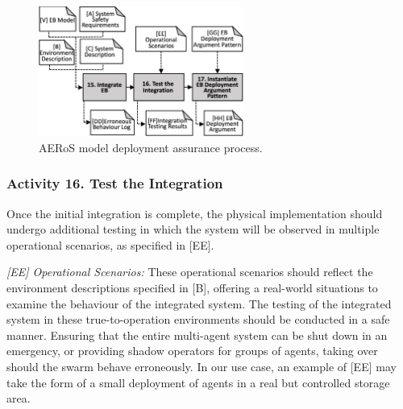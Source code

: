 \documentclass[runningheads]{llncs}
\begin{document}
\begin{figure}[!t]
	\centering
	\includegraphics[width=0.60\textwidth]{figures/AMLAS-STAGE-6-V4.png}%
	\vspace{-2ex}
	\caption{AERoS model deployment assurance process.}
	\label{amlas-a-stage6}
	\vspace{-4ex}
\end{figure}



\subsubsection*{Activity 16. Test the Integration}

Once the initial integration is complete, the physical implementation should undergo additional testing in which the system will be observed in multiple operational scenarios, as specified in [EE].

\emph{[EE] Operational Scenarios:} These operational scenarios should reflect the environment descriptions specified in [B], offering a real-world situations to examine the behaviour of the integrated system. The testing of the integrated system in these true-to-operation environments should be conducted in a safe manner. Ensuring that the entire multi-agent system can be shut down in an emergency, or providing shadow operators for groups of agents, taking over should the swarm behave erroneously. In our use case, an example of [EE] may take the form of a small deployment of agents in a real but controlled storage area.



\end{document}
